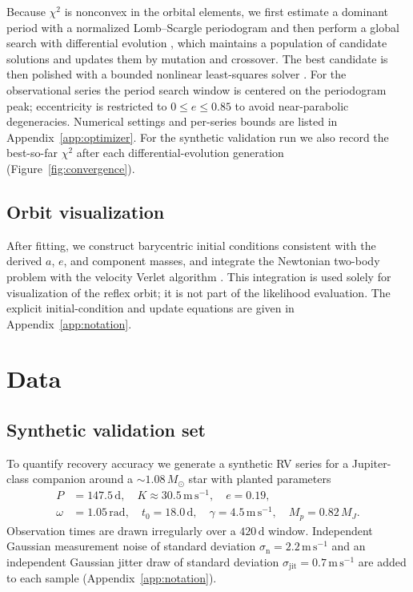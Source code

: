\documentclass[11pt]{article}
\begin{document}
Because $\chi^2$ is nonconvex in the orbital elements, we first estimate a
dominant period with a normalized Lomb--Scargle periodogram
\citep{virtanen2020scipy} and then perform a global search with differential
evolution \citep{storn1997differential,virtanen2020scipy}, which maintains a
population of candidate solutions and updates them by mutation and crossover.
The best candidate is then polished with a bounded nonlinear least-squares
solver \citep{virtanen2020scipy}. For the observational series the period
search window is centered on the periodogram peak; eccentricity is restricted
to $0 \le e \le 0.85$ to avoid near-parabolic degeneracies. Numerical settings
and per-series bounds are listed in Appendix~\ref{app:optimizer}. For the
synthetic validation run we also record the best-so-far $\chi^2$ after each
differential-evolution generation (Figure~\ref{fig:convergence}).

\subsection{Orbit visualization}

After fitting, we construct barycentric initial conditions consistent with the
derived $a$, $e$, and component masses, and integrate the Newtonian two-body
problem with the velocity Verlet algorithm \citep{verlet1967computer}. This
integration is used solely for visualization of the reflex orbit; it is not
part of the likelihood evaluation. The explicit initial-condition and update
equations are given in Appendix~\ref{app:notation}.

\section{Data}

\subsection{Synthetic validation set}

To quantify recovery accuracy we generate a synthetic RV series for a
Jupiter-class companion around a $\sim 1.08\,M_\odot$ star with planted
parameters
\begin{equation*}
\begin{aligned}
P &= 147.5\,\mathrm{d},\quad
K \approx 30.5\,\mathrm{m\,s^{-1}},\quad
e = 0.19,\\
\omega &= 1.05\,\mathrm{rad},\quad
t_0 = 18.0\,\mathrm{d},\quad
\gamma = 4.5\,\mathrm{m\,s^{-1}},\quad
M_p = 0.82\,M_J.
\end{aligned}
\end{equation*}
Observation times are drawn irregularly over a $420\,\mathrm{d}$ window.
Independent Gaussian measurement noise of standard deviation
$\sigma_{\mathrm{n}} = 2.2\,\mathrm{m\,s^{-1}}$ and an independent Gaussian
jitter draw of standard deviation
$\sigma_{\mathrm{jit}} = 0.7\,\mathrm{m\,s^{-1}}$ are added to each sample
(Appendix~\ref{app:notation}).
\end{document}
